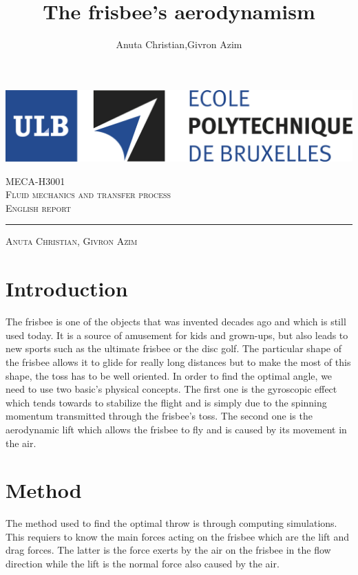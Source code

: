 \documentclass[10pt,a4paper]{report}
\author{Anuta Christian,Givron Azim}
\title{The frisbee's aerodynamism}
\begin{document}
\begin{titlepage}

\includegraphics[scale=0.5]{logo-polytech-ULB-FR.jpg}

\center 
\vspace{5cm}
\textsc{\large MECA-H3001} \\[0.5cm]
\textsc{\LARGE Fluid mechanics and transfer process} \\[1.5cm]
\textsc{\Large English report} %

\rule{\textwidth}{1pt}

\vspace{2cm}

\textsc{\large Anuta Christian, Givron Azim}

\end{titlepage}



\tableofcontents
\newpage 
\section{Introduction}
The frisbee is one of the objects that was invented decades ago and which is still used today. It is a source of amusement for kids and grown-ups, but also leads to new sports such as the ultimate frisbee or the disc golf. The particular shape of the frisbee allows it to glide for really long distances but to make the most of this shape, the toss has to be well oriented. In order to find the optimal angle, we need to use two basic’s physical concepts. The first one is the gyroscopic effect which tends towards to stabilize the flight and is simply due to the spinning momentum transmitted through the frisbee’s toss. The second one is the aerodynamic lift which allows the frisbee to fly and is caused by its movement in the air.

\section{Method}
The method used to find the optimal throw is through computing simulations. This requiers to know the main forces acting on the frisbee which are the lift and drag forces. The latter is the force exerts by the air on the frisbee in the flow direction while the lift is the normal force also caused by the air.
\end{document}
